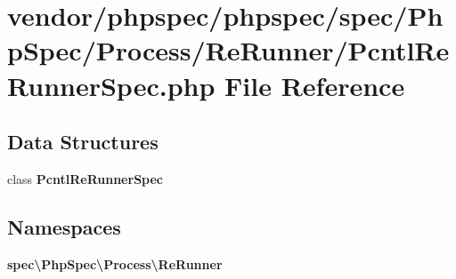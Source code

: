 \section{vendor/phpspec/phpspec/spec/\+Php\+Spec/\+Process/\+Re\+Runner/\+Pcntl\+Re\+Runner\+Spec.php File Reference}
\label{_pcntl_re_runner_spec_8php}
\subsection*{Data Structures}
\begin{DoxyCompactItemize}
\item 
class {\bf Pcntl\+Re\+Runner\+Spec}
\end{DoxyCompactItemize}
\subsection*{Namespaces}
\begin{DoxyCompactItemize}
\item 
 {\bf spec\textbackslash{}\+Php\+Spec\textbackslash{}\+Process\textbackslash{}\+Re\+Runner}
\end{DoxyCompactItemize}
